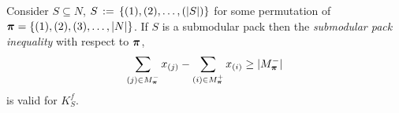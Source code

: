 \documentclass[10pt,twoside]{amsart}
\begin{document}
\begin{prop}
    Consider $S\subseteq N$, $S \,:=\, \{(1), (2), \ldots, (|S|)\}$ for some permutation of $\boldsymbol\pi = \{(1), (2), (3),\ldots, |N|\}$. If $S$ is a submodular pack then the \emph{submodular pack inequality} with respect to $\boldsymbol\pi$,
    \begin{align}
      \sum_{(j) \in M^-_{\boldsymbol\pi}} x_{(j)} - \sum_{(i) \in M^+_{\boldsymbol\pi}} x_{(i)} \geq |M^-_{\boldsymbol\pi}| \label{ineq:submodpack}
    \end{align}
    is valid for $K^f_{S}$.
\end{prop}
%
\end{document}
